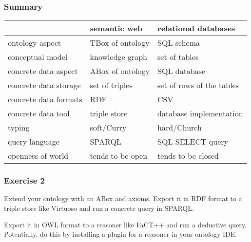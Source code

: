 \begin{frame}\frametitle{Summary}
\begin{tabular}{l|ll}
  & semantic web & relational databases \\
\hline
ontology aspect & TBox of ontology & SQL schema \\
conceptual model & knowledge graph & set of tables \\
concrete data aspect & ABox of ontology & SQL database \\
concrete data storage & set of triples & set of rows of the tables \\
concrete data formats & RDF & CSV \\
concrete data tool & triple store & database implementation \\
typing & soft/Curry & hard/Church\\
query language & SPARQL & SQL SELECT query \\
openness of world & tends to be open & tends to be closed \\
\end{tabular}
\end{frame}


\begin{frame}\frametitle{Exercise 2}
Extend your ontology with an ABox and axioms.
Export it in RDF format to a triple store like Virtuoso and run a concrete query in SPARQL.

Export it in OWL format to a reasoner like FaCT++ and run a deductive query.
Potentially, do this by installing a plugin for a reasoner in your ontology IDE.
\end{frame}